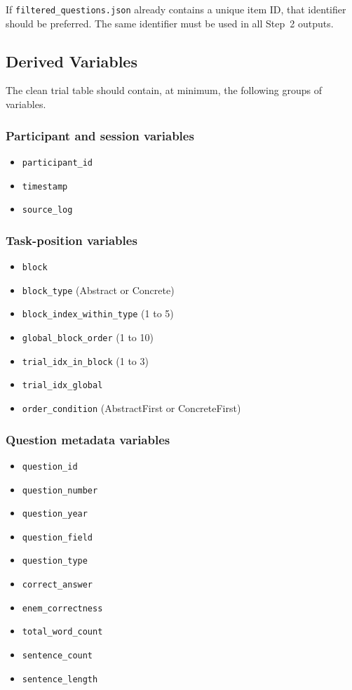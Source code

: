 If \texttt{filtered\_questions.json} already contains a unique item ID, that identifier should be preferred.
The same identifier must be used in all Step~2 outputs.

\subsection{Derived Variables}
The clean trial table should contain, at minimum, the following groups of variables.

\subsubsection*{Participant and session variables}
\begin{itemize}
    \item \texttt{participant\_id}
    \item \texttt{timestamp}
    \item \texttt{source\_log}
\end{itemize}

\subsubsection*{Task-position variables}
\begin{itemize}
    \item \texttt{block}
    \item \texttt{block\_type} (Abstract or Concrete)
    \item \texttt{block\_index\_within\_type} (1 to 5)
    \item \texttt{global\_block\_order} (1 to 10)
    \item \texttt{trial\_idx\_in\_block} (1 to 3)
    \item \texttt{trial\_idx\_global}
    \item \texttt{order\_condition} (AbstractFirst or ConcreteFirst)
\end{itemize}

\subsubsection*{Question metadata variables}
\begin{itemize}
    \item \texttt{question\_id}
    \item \texttt{question\_number}
    \item \texttt{question\_year}
    \item \texttt{question\_field}
    \item \texttt{question\_type}
    \item \texttt{correct\_answer}
    \item \texttt{enem\_correctness}
    \item \texttt{total\_word\_count}
    \item \texttt{sentence\_count}
    \item \texttt{sentence\_length}
\end{itemize}

